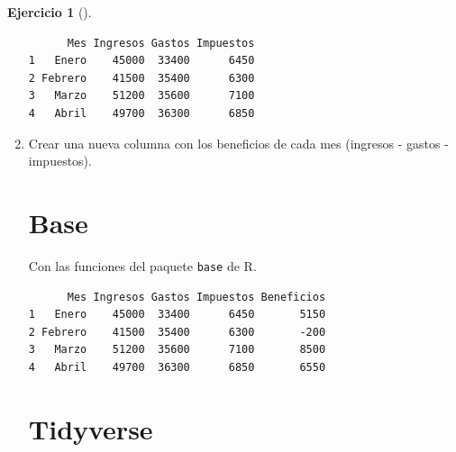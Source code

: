 \documentclass[
  a4paper,
]{scrreport}
\newenvironment{Shaded}{\begin{snugshade}}{\end{snugshade}}
\newcommand{\NormalTok}[1]{\textcolor[rgb]{0.00,0.23,0.31}{#1}}
\newcommand{\OtherTok}[1]{\textcolor[rgb]{0.00,0.23,0.31}{#1}}
\newcommand{\SpecialCharTok}[1]{\textcolor[rgb]{0.37,0.37,0.37}{#1}}
\theoremstyle{definition}
\newtheorem{exercise}{Ejercicio}[chapter]
\theoremstyle{remark}
\begin{document}
\begin{exercise}[]
\begin{enumerate}
\begin{tcolorbox}
\begin{verbatim}
      Mes Ingresos Gastos Impuestos
1   Enero    45000  33400      6450
2 Febrero    41500  35400      6300
3   Marzo    51200  35600      7100
4   Abril    49700  36300      6850
\end{verbatim}

  \end{tcolorbox}
\item
  Crear una nueva columna con los beneficios de cada mes (ingresos -
  gastos - impuestos).

  \begin{tcolorbox}[enhanced jigsaw, breakable, toptitle=1mm, colbacktitle=quarto-callout-tip-color!10!white, rightrule=.15mm, opacityback=0, opacitybacktitle=0.6, titlerule=0mm, coltitle=black, colframe=quarto-callout-tip-color-frame, colback=white, bottomtitle=1mm, leftrule=.75mm, toprule=.15mm, title=\textcolor{quarto-callout-tip-color}{\faLightbulb}\hspace{0.5em}{Solución}, arc=.35mm, bottomrule=.15mm, left=2mm]

  \section{Base}

  Con las funciones del paquete \texttt{base} de R.

\begin{Shaded}
\end{Shaded}

\begin{verbatim}
      Mes Ingresos Gastos Impuestos Beneficios
1   Enero    45000  33400      6450       5150
2 Febrero    41500  35400      6300       -200
3   Marzo    51200  35600      7100       8500
4   Abril    49700  36300      6850       6550
\end{verbatim}

  \section{Tidyverse}


\end{tcolorbox}
\end{enumerate}
\end{exercise}
\end{document}
